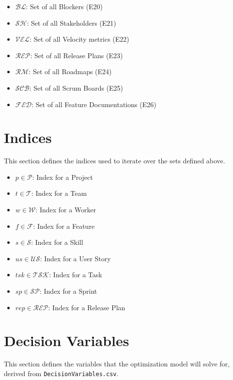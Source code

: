 \documentclass[11pt, a4paper]{article}
\begin{document}
\begin{itemize}
    \item $\mathcal{BL}$: Set of all Blockers (E20)
    \item $\mathcal{SH}$: Set of all Stakeholders (E21)
    \item $\mathcal{VEL}$: Set of all Velocity metrics (E22)
    \item $\mathcal{REP}$: Set of all Release Plans (E23)
    \item $\mathcal{RM}$: Set of all Roadmaps (E24)
    \item $\mathcal{SCB}$: Set of all Scrum Boards (E25)
    \item $\mathcal{FED}$: Set of all Feature Documentations (E26)
\end{itemize}

\section{Indices}
This section defines the indices used to iterate over the sets defined above.

\begin{itemize}
    \item $p \in \mathcal{P}$: Index for a Project
    \item $t \in \mathcal{T}$: Index for a Team
    \item $w \in \mathcal{W}$: Index for a Worker
    \item $f \in \mathcal{F}$: Index for a Feature
    \item $s \in \mathcal{S}$: Index for a Skill
    \item $us \in \mathcal{US}$: Index for a User Story
    \item $tsk \in \mathcal{TSK}$: Index for a Task
    \item $sp \in \mathcal{SP}$: Index for a Sprint
    \item $rep \in \mathcal{REP}$: Index for a Release Plan
\end{itemize}

\section{Decision Variables}
This section defines the variables that the optimization model will solve for, derived from \texttt{DecisionVariables.csv}.
\end{document}
